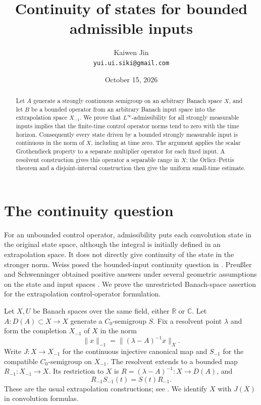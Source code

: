 \documentclass[11pt]{article}
\title{Continuity of states for bounded admissible inputs}
\author{Kaiwen Jin\\ \small\texttt{yui.ui.siki@gmail.com}}
\date{October 15, 2026}
\theoremstyle{remark}
\newcommand{\R}{\mathbb R}
\newcommand{\C}{\mathbb C}
\begin{document}
\maketitle
\begin{abstract}
Let \(A\) generate a strongly continuous semigroup on an arbitrary Banach
space \(X\), and let \(B\) be a bounded operator from an arbitrary Banach
input space into the extrapolation space \(X_{-1}\).
We prove that \(L^\infty\)-admissibility for all strongly measurable inputs
implies that the finite-time control operator norms tend to zero with the
time horizon. Consequently every state driven by a bounded strongly
measurable input is continuous in the norm of \(X\), including at time zero.
The argument applies the scalar Grothendieck property to a separate
multiplier operator for each fixed input. A resolvent construction gives
this operator a separable range in \(X\); the Orlicz--Pettis theorem and a
disjoint-interval construction then give the uniform small-time estimate.
\end{abstract}

\section{The continuity question}

For an unbounded control operator, admissibility puts each convolution
state in the original state space, although the integral is initially
defined in an extrapolation space. It does not directly give continuity
of the state in the stronger norm. Weiss posed the bounded-input
continuity question in \cite[Problem~2.4]{Weiss}.
Preu{\ss}ler and Schwenninger obtained positive answers under several
geometric assumptions on the state and input spaces
\cite[Corollary~4.10 and the discussion following Corollary~4.11]{PS}.
We prove the unrestricted Banach-space assertion for the extrapolation
control-operator formulation.

Let \(X,U\) be Banach spaces over the same field, either \(\R\) or \(\C\).
Let \(A:D(A)\subset X\to X\) generate a \(C_0\)-semigroup \(S\).
Fix a resolvent point \(\lambda\) and form the completion \(X_{-1}\) of
\(X\) in the norm
\[
 \|x\|_{-1}=\|(\lambda-A)^{-1}x\|_X .
\]
Write \(J:X\to X_{-1}\) for the continuous injective canonical map and
\(S_{-1}\) for the compatible \(C_0\)-semigroup on \(X_{-1}\).
The resolvent extends to a bounded map
\(R_{-1}:X_{-1}\to X\). Its restriction to \(X\) is
\(R=(\lambda-A)^{-1}:X\to D(A)\), and
\[
 R_{-1}S_{-1}(t)=S(t)R_{-1}.
\]
These are the usual extrapolation constructions; see
\cite[Definition~3.1, Proposition~3.3 and Remark~3.4]{Weiss}.
We identify \(X\) with \(J(X)\) in convolution formulas.
\end{document}
